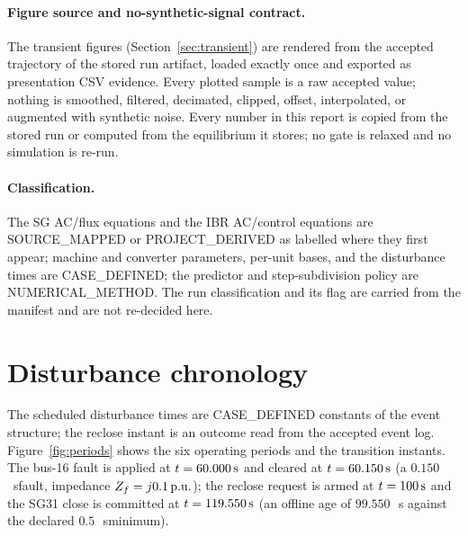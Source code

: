 \documentclass[12pt,a4paper]{article}
\newcommand{\pu}{\ifmmode\,\mathrm{p.u.}\else\ p.u.\fi}
\newcommand{\second}{\ifmmode\,\mathrm{s}\else\ s\fi}
\newcommand{\code}[1]{\texttt{\detokenize{#1}}}
\begin{document}
\paragraph{Figure source and no-synthetic-signal contract.}
The transient figures (Section~\ref{sec:transient}) are rendered from the
accepted trajectory of the stored run artifact, loaded exactly once and exported
as presentation CSV evidence.  Every plotted sample is a raw accepted value;
nothing is smoothed, filtered, decimated, clipped, offset, interpolated, or
augmented with synthetic noise.  Every number in this report is copied from the
stored run or computed from the equilibrium it stores; no gate is relaxed and no
simulation is re-run.

\paragraph{Classification.}
The SG AC/flux equations and the IBR AC/control equations are
\textsf{SOURCE\_MAPPED} or \textsf{PROJECT\_DERIVED} as labelled where they first
appear; machine and converter parameters, per-unit bases, and the disturbance
times are \textsf{CASE\_DEFINED}; the predictor and step-subdivision policy are
\textsf{NUMERICAL\_METHOD}.  The run classification and its
\code{production_certified=false} flag are carried from the manifest and are
not re-decided here.

\section{Disturbance chronology}\label{sec:chrono}
The scheduled disturbance times are \textsf{CASE\_DEFINED} constants of the
event structure; the reclose instant is an outcome read from the accepted event
log.  Figure~\ref{fig:periods} shows the six operating periods and the
transition instants.  The bus-16 fault is applied at $t=60.000\second$ and
cleared at $t=60.150\second$ (a $0.150$\second fault, impedance
$Z_f=j0.1\pu$); the reclose request is armed at $t=100\second$ and the SG31
close is committed at $t=119.550\second$ (an offline age of $99.550$\second
against the declared $0.5$\second minimum).
\end{document}

